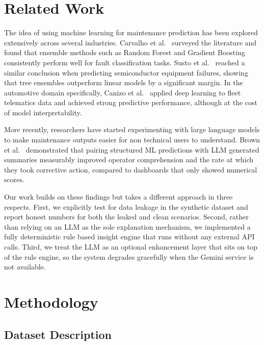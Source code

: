 \documentclass[conference]{IEEEtran}
\begin{document}
\section{Related Work}

The idea of using machine learning for maintenance prediction has been explored extensively across several industries. Carvalho et al.~\cite{carvalho2019} surveyed the literature and found that ensemble methods such as Random Forest and Gradient Boosting consistently perform well for fault classification tasks. Susto et al.~\cite{susto2015} reached a similar conclusion when predicting semiconductor equipment failures, showing that tree ensembles outperform linear models by a significant margin. In the automotive domain specifically, Canizo et al.~\cite{canizo2017} applied deep learning to fleet telematics data and achieved strong predictive performance, although at the cost of model interpretability.

More recently, researchers have started experimenting with large language models to make maintenance outputs easier for non technical users to understand. Brown et al.~\cite{brown2024} demonstrated that pairing structured ML predictions with LLM generated summaries measurably improved operator comprehension and the rate at which they took corrective action, compared to dashboards that only showed numerical scores.

Our work builds on these findings but takes a different approach in three respects. First, we explicitly test for data leakage in the synthetic dataset and report honest numbers for both the leaked and clean scenarios. Second, rather than relying on an LLM as the sole explanation mechanism, we implemented a fully deterministic rule based insight engine that runs without any external API calls. Third, we treat the LLM as an optional enhancement layer that sits on top of the rule engine, so the system degrades gracefully when the Gemini service is not available.

\section{Methodology}

\subsection{Dataset Description}
\end{document}
